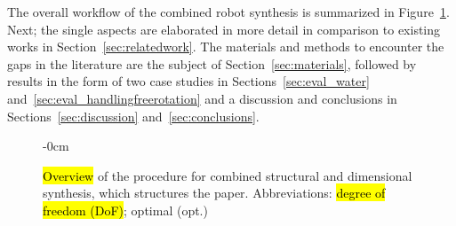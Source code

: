 %
The overall workflow of the combined robot synthesis is summarized in Figure~\ref{fig:comb_struct_dim_synth}. %
%
Next; the single aspects are elaborated in more detail in comparison to existing works in Section~\ref{sec:relatedwork}.
The materials and methods to encounter the gaps in the literature are the subject of Section~\ref{sec:materials}, followed by results in the form of two case studies in Sections~\ref{sec:eval_water} and~\ref{sec:eval_handlingfreerotation} and a discussion and conclusions in Sections~\ref{sec:discussion} and~\ref{sec:conclusions}.

%
%

%
%
%


%


%
%
%
%
%
%
%
%


\begin{figure}[H]
\begin{adjustwidth}{-\extralength}{0cm}
  \centering
  \graphicspath{{./Figures/}}
  
\end{adjustwidth}
\caption{\hl{Overview} %
  of the procedure for combined structural and dimensional synthesis, which structures the paper. Abbreviations: \hl{degree of freedom (DoF)}; optimal (opt.)} %
\label{fig:comb_struct_dim_synth}
\end{figure} 

